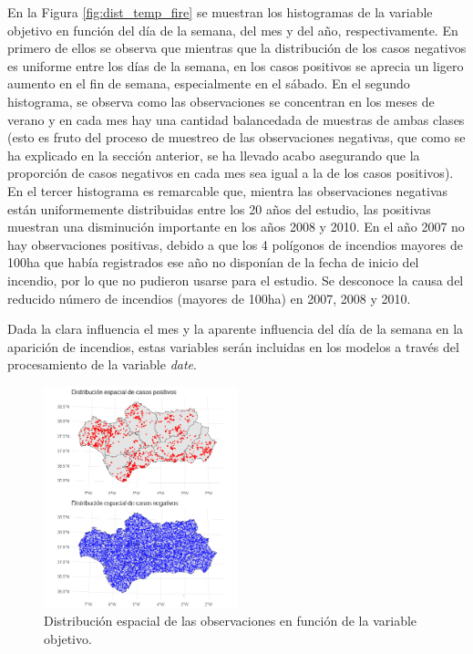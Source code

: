 \documentclass[12pt,a4paper,]{book}
\numberwithin{dummy}{section}
\theoremstyle{ocrenumbox}
\theoremstyle{blacknumex}
\theoremstyle{blacknumbox}
\theoremstyle{ocrenum}
\theoremstyle{ocrenum}
\begin{document}
En la Figura \ref{fig:dist_temp_fire} se muestran los histogramas de la
variable objetivo en función del día de la semana, del mes y del año,
respectivamente. En primero de ellos se observa que mientras que la
distribución de los casos negativos es uniforme entre los días de la
semana, en los casos positivos se aprecia un ligero aumento en el fin de
semana, especialmente en el sábado. En el segundo histograma, se observa
como las observaciones se concentran en los meses de verano y en cada
mes hay una cantidad balancedada de muestras de ambas clases (esto es
fruto del proceso de muestreo de las observaciones negativas, que como
se ha explicado en la sección anterior, se ha llevado acabo asegurando
que la proporción de casos negativos en cada mes sea igual a la de los
casos positivos). En el tercer histograma es remarcable que, mientra las
observaciones negativas están uniformemente distribuidas entre los 20
años del estudio, las positivas muestran una disminución importante en
los años 2008 y 2010. En el año 2007 no hay observaciones positivas,
debido a que los 4 polígonos de incendios mayores de 100ha que había
registrados ese año no disponían de la fecha de inicio del incendio, por
lo que no pudieron usarse para el estudio. Se desconoce la causa del
reducido número de incendios (mayores de 100ha) en 2007, 2008 y 2010.

Dada la clara influencia el mes y la aparente influencia del día de la
semana en la aparición de incendios, estas variables serán incluidas en
los modelos a través del procesamiento de la variable \emph{date}.

\begin{figure}[h]
\centering
\includegraphics[width = 0.5\textwidth]{graficos/distribucion_espacial_fire.png}
\caption{Distribución espacial de las observaciones en función de la variable objetivo.}
\label{fig:dist_spat_fire}
\end{figure}
\end{document}
